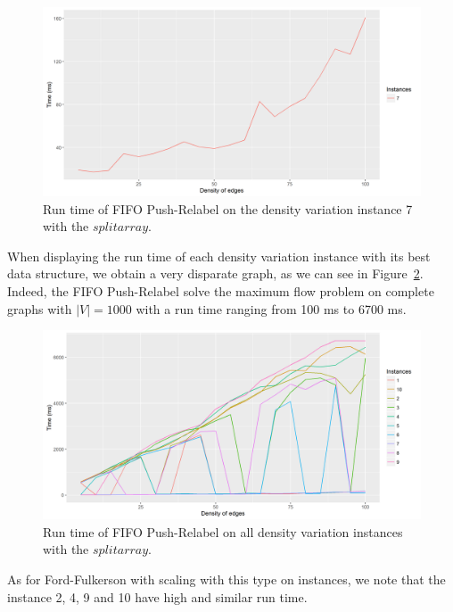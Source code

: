 \begin{figure}[H]
\begin{center}
\includegraphics[scale=0.5]{images/results/pri7.png}
\caption{Run time of FIFO Push-Relabel on the density variation instance 7 with the $split array$.}
\label{fig:PR7}
\end{center}
\end{figure}
When displaying the run time of each density variation instance with its best data structure, we obtain a very disparate graph, as we can see in Figure~\ref{fig:PRmean}. Indeed, the FIFO Push-Relabel solve the maximum flow problem on complete graphs with $|V|=1000$ with a run time ranging from 100 ms to 6700 ms.
\begin{figure}[H]
\begin{center}
\includegraphics[scale=0.5]{images/results/PRmean.png}
\caption{Run time of FIFO Push-Relabel on all density variation instances with the $split array$.}
\label{fig:PRmean}
\end{center}
\end{figure}

As for Ford-Fulkerson with scaling with this type on instances, we note that the instance 2, 4, 9 and 10 have high and similar run time.
